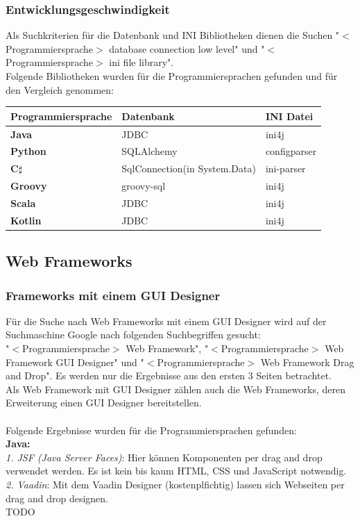 \documentclass[ngerman]{article}
\begin{document}
    \subsubsection{Entwicklungsgeschwindigkeit}
    \label{GrundlagenEntwicklungsgeschwindigkeit}
    Als Suchkriterien für die Datenbank und INI Bibliotheken dienen die Suchen "$<$Programmiersprache$>$ database connection low level" und "$<$Programmiersprache$>$ ini file library".\\
    Folgende Bibliotheken wurden für die Programmiersprachen gefunden und für den Vergleich genommen:
    \begin{tabularx}{\textwidth}{|X|X|X|}
        \hline
        \textbf{Programmiersprache}&\textbf{Datenbank}&\textbf{INI Datei}\\
        \hline
        \textbf{Java}&JDBC&ini4j\\
        \hline
        \textbf{Python}&SQLAlchemy&configparser\\
        \hline
        \textbf{C$\sharp$}&SqlConnection(in System.Data)&ini-parser\\
        \hline
        \textbf{Groovy}&groovy-sql&ini4j\\
        \hline
        \textbf{Scala}&JDBC&ini4j\\
        \hline
        \textbf{Kotlin}&JDBC&ini4j\\
        \hline
    \end{tabularx}
    \subsection{Web Frameworks}
    \subsubsection{Frameworks mit einem GUI Designer}
    \label{GrundlagenWebFrameworksWithGUIDesigner}
    Für die Suche nach Web Frameworks mit einem GUI Designer wird auf der Suchmaschine Google nach folgenden Suchbegriffen gesucht:\\
    "$<$Programmiersprache$>$ Web Framework", "$<$Programmiersprache$>$ Web Framework GUI Designer" und "$<$Programmiersprache$>$ Web Framework Drag and Drop". Es werden nur die Ergebnisse aus den ersten 3 Seiten betrachtet.\\
    Als Web Framework mit GUI Designer zählen auch die Web Frameworks, deren Erweiterung einen GUI Designer bereitstellen.\\\\
    Folgende Ergebnisse wurden für die Programmiersprachen gefunden:\\
    \textbf{Java:}\\
    \textit{1. JSF (Java Server Faces)}: Hier können Komponenten per drag and drop verwendet werden. Es ist kein bis kaum HTML, CSS und JavaScript notwendig. \cite{JavaWebFramework1}\\
    \textit{2. Vaadin}: Mit dem Vaadin Designer (kostenplfichtig) lassen sich Webseiten per drag and drop designen. \cite{JavaVaadinDesigner}\\
    TODO
    \newpage\noindent
\end{document}
